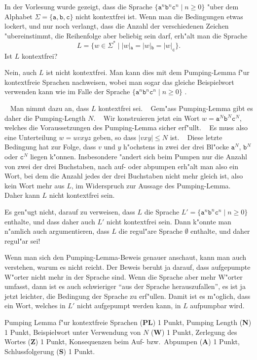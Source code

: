 In der Vorlesung wurde gezeigt, dass die Sprache
$\{\texttt{a}^n\texttt{b}^n\texttt{c}^n\;|\;n\ge 0\}$
"uber dem Alphabet $\Sigma=\{\texttt{a},\texttt{b},\texttt{c}\}$
nicht kontextfrei ist.
Wenn man die Bedingungen etwas lockert, und nur noch verlangt, dass die
Anzahl der verschiedenen Zeichen "ubereinstimmt, die Reihenfolge aber
beliebig sein darf, erh"alt man die Sprache
\[
L=\{w\in\Sigma^*\;|\;|w|_\texttt{a}=|w|_\texttt{b}=|w|_\texttt{c}\}.
\]
Ist $L$ kontextfrei?

\begin{loesung}
Nein, auch $L$ ist nicht kontextfrei.
Man kann dies mit dem Pumping-Lemma f"ur kontextfreie Sprachen nachweisen,
wobei man sogar das gleiche Beispielwort verwenden kann wie im Falle der
Sprache $\{ \texttt{a}^n \texttt{b}^n \texttt{c}^n\;|\; n \ge 0\}$ .

~%
Man nimmt dazu an, dass $L$ kontextfrei sei.
~%
Gem"ass Pumping-Lemma gibt es daher die Pumping-Length $N$.
~%
Wir konstruieren jetzt ein Wort
$w=\texttt{a}^N\texttt{b}^N\texttt{c}^N$, welches die Voraussetzungen
des Pumping-Lemma sicher erf"ullt.
~%
Es muss also eine Unterteilung $w=uvxyz$ geben, so dass $|vxy|\le N$ ist.
~%
Diese letzte Bedingung hat zur Folge, dass $v$ und $y$ h"ochstens in
zwei der drei Bl"ocke $\texttt{a}^N$, $\texttt{b}^N$ oder $\texttt{c}^N$
liegen k"onnen.
Insbesondere "andert sich beim Pumpen nur die Anzahl von zwei der drei
Buchstaben, nach auf- oder abpumpen erh"alt man also ein Wort, bei dem 
die Anzahl jedes der drei Buchstaben nicht mehr gleich ist, also kein
Wort mehr aus $L$, im Widerspruch zur Aussage des Pumping-Lemma.
~%
Daher kann $L$ nicht kontextfrei sein.
\end{loesung}

\begin{diskussion}
Es gen"ugt nicht, darauf zu verweisen, dass $L$ die Sprache
$L'=\{ \texttt{a}^n \texttt{b}^n \texttt{c}^n\;|\; n\ge 0\}$ enthalte,
und dass daher auch $L'$ nicht kontextfrei sein.  Dann k"onnte man n"amlich auch
argumentieren, dass $L$ die regul"are Sprache $\emptyset$ enthalte, und daher
regul"ar sei!

Wenn man sich den Pumping-Lemma-Beweis genauer anschaut, kann man auch verstehen,
warum es nicht reicht. Der Beweis beruht ja darauf, dass aufgepumpte W"orter nicht
mehr in der Sprache sind. Wenn die Sprache aber mehr W"orter umfasst, dann ist
es auch schwieriger ``aus der Sprache herauszufallen'', es ist ja jetzt leichter,
die Bedingung der Sprache zu erf"ullen. Damit ist es m"oglich, dass ein Wort, welches
in $L'$ nicht aufgepumpt werden kann, in $L$ aufpumpbar wird.
\end{diskussion}

\begin{bewertung}
Pumping Lemma f"ur kontextfreie Sprachen ({\bf PL}) 1 Punkt,
Pumping Length ({\bf N}) 1 Punkt,
Beispielwort unter Verwendung von $N$ ({\bf W}) 1 Punkt,
Zerlegung des Wortes ({\bf Z}) 1 Punkt,
Konsequenzen beim Auf- bzw.~Abpumpen ({\bf A}) 1 Punkt,
Schlussfolgerung ({\bf S}) 1 Punkt.
\end{bewertung}

